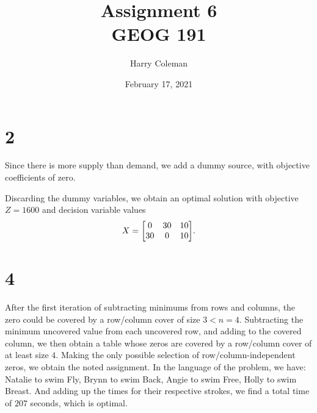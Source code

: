\documentclass[12pt]{article}
\title{\vspace{-0.5in}Assignment 6 \\
    \large GEOG 191
}
\author{Harry Coleman}
\date{February 17, 2021}
\theoremstyle{definition}
\begin{document}
\maketitle

\section*{2}
Since there is more supply than demand, we add a dummy source, with objective coefficients of zero.



Discarding the dummy variables, we obtain an optimal solution with objective $Z = 1600$ and decision variable values
\[
    X = \mqty[0 & 30 & 10 \\ 30 & 0 & 10].
\]

\newpage
\section*{4}


After the first iteration of subtracting minimums from rows and columns, the zero could be covered by a row/column cover of size $3 < n = 4$. Subtracting the minimum uncovered value from each uncovered row, and adding to the covered column, we then obtain a table whose zeros are covered by a row/column cover of at least size $4$. Making the only possible selection of row/column-independent zeros, we obtain the noted assignment. In the language of the problem, we have: Natalie to swim Fly, Brynn to swim Back, Angie to swim Free, Holly to swim Breast. And adding up the times for their respective strokes, we find a total time of $207$ seconds, which is optimal.
\end{document}
